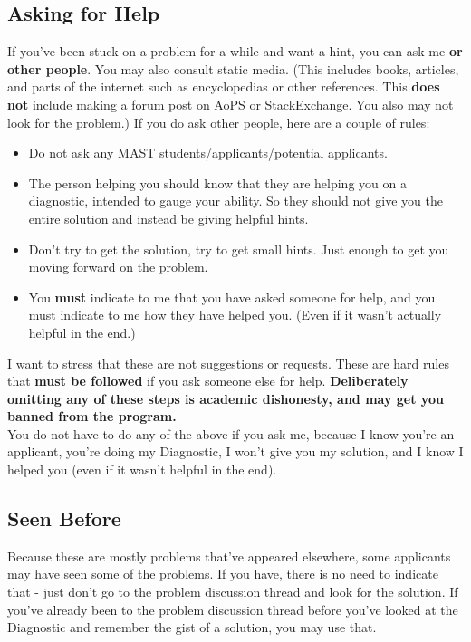 \documentclass{lucky}
\begin{document}
\subsection{Asking for Help}
If you've been stuck on a problem for a while and want a hint, you can ask me \textbf{or other people}. You may also consult static media. (This includes books, articles, and parts of the internet such as encyclopedias or other references. This \textbf{does not} include making a forum post on AoPS or StackExchange. You also may not look for the problem.) If you do ask other people, here are a couple of rules:
\begin{itemize}
\item Do not ask any MAST students/applicants/potential applicants.

\item The person helping you should know that they are helping you on a diagnostic, intended to gauge your ability. So they should not give you the entire solution and instead be giving helpful hints.

\item Don't try to get the solution, try to get small hints. Just enough to get you moving forward on the problem.

\item You \textbf{must} indicate to me that you have asked someone for help, and you must indicate to me how they have helped you. (Even if it wasn't actually helpful in the end.)
\end{itemize}
I want to stress that these are not suggestions or requests. These are hard rules that \textbf{must be followed} if you ask someone else for help. \textbf{Deliberately omitting any of these steps is academic dishonesty, and may get you banned from the program.}
\\[1\baselineskip]
You do not have to do any of the above if you ask me, because I know you're an applicant, you're doing my Diagnostic, I won't give you my solution, and I know I helped you (even if it wasn't helpful in the end).

\subsection{Seen Before}
Because these are mostly problems that've appeared elsewhere, some applicants may have seen some of the problems. If you have, there is no need to indicate that - just don't go to the problem discussion thread and look for the solution. If you've already been to the problem discussion thread before you've looked at the Diagnostic and remember the gist of a solution, you may use that.
\end{document}
